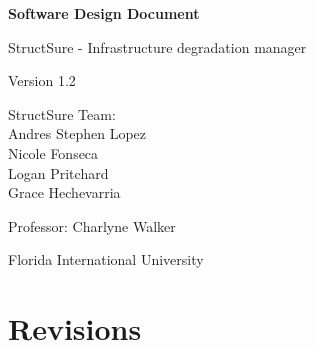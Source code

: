 \documentclass[12pt]{article}
\begin{document}
\begin{titlepage}
\centering

\vspace*{1cm}

{\Huge\textbf{Software Design Document}}

\vspace{0.5cm}

{\Large StructSure - Infrastructure degradation manager}

\vspace{2cm}

{\large Version 1.2}

\vspace{3cm}

StructSure Team:\\
Andres Stephen Lopez\\
Nicole Fonseca\\
Logan Pritchard\\
Grace Hechevarria

\vspace{3cm}

Professor: Charlyne Walker

\vspace{0.5cm}

Florida International University

\vfill

\date{\today}

\end{titlepage}

\newpage

\section*{Revisions}
\end{document}

